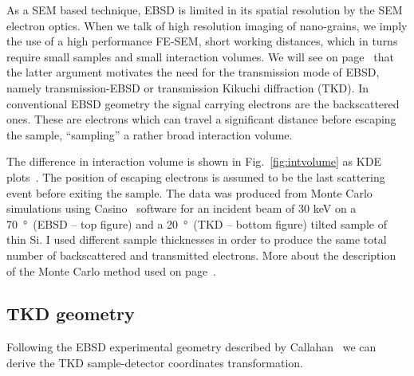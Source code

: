 As a SEM based technique, EBSD is limited in its spatial resolution by the SEM electron optics. When we talk of high resolution imaging of nano-grains, we imply the use of a high performance FE-SEM, short working distances, which in turns require small samples and small interaction volumes. We will see on page~\pageref{sec:motivation} that the latter argument motivates the need for the transmission mode of EBSD, namely transmission-EBSD or transmission Kikuchi diffraction (TKD). In conventional EBSD geometry the signal carrying electrons are the backscattered ones. These are electrons which can travel a significant distance before escaping the sample, ``sampling'' a rather broad interaction volume. 



The difference in interaction volume is shown in Fig.~\ref{fig:intvolume} as KDE plots~\cite{KDE}. The position of escaping electrons is assumed to be the last scattering event before exiting the sample.  The data was produced from Monte Carlo simulations using Casino~\cite{casino} software for an incident beam of 30 keV on a \SI{70}{\degree}~(EBSD -- top figure) and a \SI{20}{\degree}~(TKD -- bottom figure) tilted sample of thin Si. I used different sample thicknesses in order to produce the same total number of backscattered and transmitted electrons. More about the description of the Monte Carlo method used on page~\pageref{sec:MC}.







\subsection{TKD geometry}

Following the EBSD experimental geometry described by Callahan~\cite{degraef2013e} we can derive the TKD sample-detector coordinates transformation.


